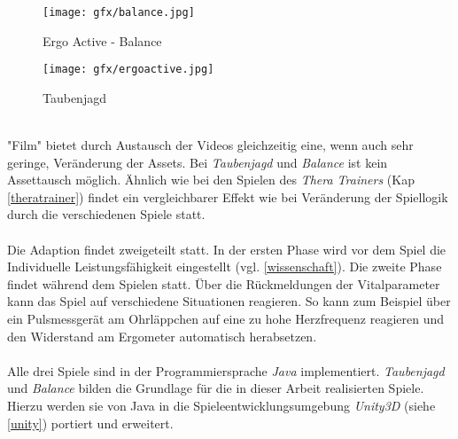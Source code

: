 			\begin{figure}[h]
	  			\centering
  				\begin{minipage}[b]{6 cm}
    					\texttt{[image: gfx/balance.jpg]} 
    					\caption{Ergo Active - Balance}
    					\label{balance}
  				\end{minipage}
				\begin{minipage}[b]{6 cm}
    					\texttt{[image: gfx/ergoactive.jpg]} 
    					\caption{Taubenjagd}
    					\label{ergoactive}
  				\end{minipage}
			\end{figure}
\\
	 		"Film" bietet durch Austausch der Videos gleichzeitig eine, wenn auch sehr geringe, Veränderung der Assets. 				Bei \textit{Taubenjagd} und \textit{Balance} ist kein Assettausch möglich. Ähnlich wie bei den Spielen des 				\textit{Thera Trainers} (Kap \ref{theratrainer}) findet ein vergleichbarer Effekt wie bei Veränderung der Spiellogik durch die verschiedenen Spiele statt.
			\\ \\
			Die Adaption findet zweigeteilt statt. In der ersten Phase wird vor dem Spiel die Individuelle Leistungsfähigkeit 				eingestellt (vgl. \ref{wissenschaft}). Die zweite Phase findet während dem Spielen statt. Über die 						Rückmeldungen der Vitalparameter kann das Spiel auf verschiedene Situationen reagieren. So kann zum Beispiel 			über ein Pulsmessgerät am Ohrläppchen auf eine zu hohe Herzfrequenz reagieren und den Widerstand am 				Ergometer automatisch herabsetzen.
			\\ \\
			Alle drei Spiele sind in der Programmiersprache \textit{Java} implementiert. \textit{Taubenjagd} und 				\textit{Balance} bilden die Grundlage für die in dieser Arbeit realisierten Spiele. Hierzu werden sie von Java in 				die Spieleentwicklungsumgebung \textit{Unity3D} (siehe \ref{unity}) portiert und erweitert.
